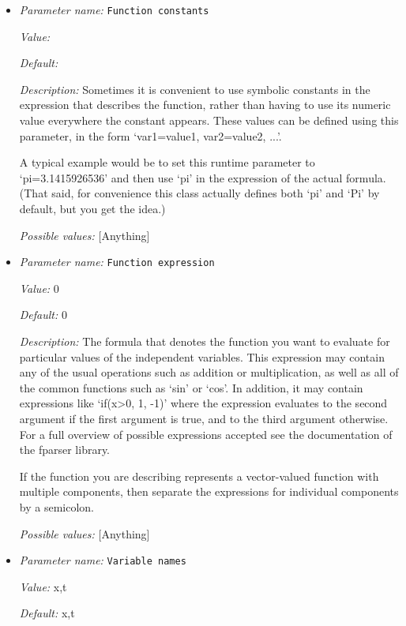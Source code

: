 \begin{itemize}
\item {\it Parameter name:} {\tt Function constants}


{\it Value:} 


{\it Default:} 


{\it Description:} Sometimes it is convenient to use symbolic constants in the expression that describes the function, rather than having to use its numeric value everywhere the constant appears. These values can be defined using this parameter, in the form `var1=value1, var2=value2, ...'.

A typical example would be to set this runtime parameter to `pi=3.1415926536' and then use `pi' in the expression of the actual formula. (That said, for convenience this class actually defines both `pi' and `Pi' by default, but you get the idea.)


{\it Possible values:} [Anything]
\item {\it Parameter name:} {\tt Function expression}


{\it Value:} 0


{\it Default:} 0


{\it Description:} The formula that denotes the function you want to evaluate for particular values of the independent variables. This expression may contain any of the usual operations such as addition or multiplication, as well as all of the common functions such as `sin' or `cos'. In addition, it may contain expressions like `if(x>0, 1, -1)' where the expression evaluates to the second argument if the first argument is true, and to the third argument otherwise. For a full overview of possible expressions accepted see the documentation of the fparser library.

If the function you are describing represents a vector-valued function with multiple components, then separate the expressions for individual components by a semicolon.


{\it Possible values:} [Anything]
\item {\it Parameter name:} {\tt Variable names}


{\it Value:} x,t


{\it Default:} x,t



\end{itemize}
